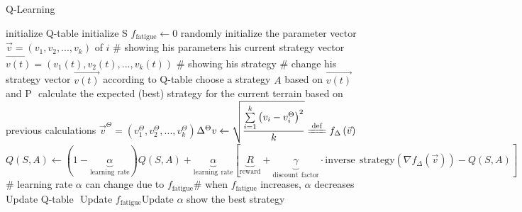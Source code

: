 \documentclass{article}
\begin{document}
\begin{algorithm}
	\caption{Q-Learning}
	\begin{algorithmic}
		\STATE initialize Q-table
		\STATE initialize S
		\STATE $f_{\mathrm{fatigue}}\leftarrow 0$
    	\STATE randomly initialize the parameter vector $\vec{v}=\left( v_1,v_2,...,v_k \right)$ of $i$ \# showing his parameters
    	\STATE his current strategy vector $\vec{v\left(t\right)}=\left( v_1\left(t\right),v_2\left(t\right),...,v_k\left(t\right) \right)$ \# showing his strategy
		\ENDFOR
    	\STATE \# change his strategy vector $\vec{v\left(t\right)}$ according to Q-table
    	\STATE choose a strategy $A$ based on $\vec{v\left(t\right)}$ and P
​ 		 \STATE calculate the expected (best) strategy for the current terrain based on previous calculations $\vec{v}^{\Theta}=\left( v_{1}^{\Theta},v_{2}^{\Theta},...,v_{k}^{\Theta} \right) $
​		 \STATE $\Delta ^{\Theta}v\leftarrow \sqrt{\dfrac{\sum\limits_{i=1}^k{\left( v_i-v_{i}^{\Theta} \right) ^2}}{k}}\xlongequal{\mathrm{def}}f_{\Delta}\left( \vec{v} \right) $
​    	 \STATE $Q(S,A)\gets (1-\underset{\mathrm{learning}\:\:\mathrm{rate}}{\underbrace{\alpha }})Q(S,A)+\underset{\mathrm{learning}\:\:\mathrm{rate}}{\underbrace{\alpha }}[\underset{\mathrm{reward}}{\underbrace{R}}+\underset{\mathrm{discount}\:\:\mathrm{factor}}{\underbrace{\gamma }}\cdot \mathrm{inverse}\:\:\mathrm{strategy}\left( \nabla f_{\Delta}\left( \vec{v} \right) \right) -Q(S,A)]$ \# learning rate $\alpha$ can change due to $f_{\mathrm{fatigue}}$
​     	 \STATE \# when $f_{\mathrm{fatigue}}$ increases, $\alpha$ decreases
​    	 \STATE Update Q-table
​    	 \STATE Update $f_{\mathrm{fatigue}}$
​    	 \STATE Update $\alpha$
		\ENDWHILE
		\STATE show the best strategy
	\end{algorithmic}
\end{algorithm}
\end{document}
